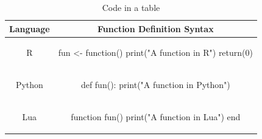 \begin{table}[htbp]
\centering
  \begin{tabular}{|c | c |}
    \hline
    Language & Function Definition Syntax \\
    \hline
    R & \begin{minipage}{0.75\textwidth}
\vspace{1mm}
\begin{example}
fun <- function(){
  print("A function in R")
  return(0)
}

\end{example}
\end{minipage}\\
\hline
Python & \begin{minipage}{0.75\textwidth}
\vspace{1mm}
\begin{example}
def fun():
  print("A function in Python")

\end{example}
\end{minipage}\\
\hline

Lua & \begin{minipage}{0.75\textwidth}
\vspace{1mm}
\begin{example}
function fun()
  print("A function in Lua")
end

\end{example}
\end{minipage}\\
\hline
\end{tabular}
\caption{Code in a table}
\label{table:2}
\end{table}

